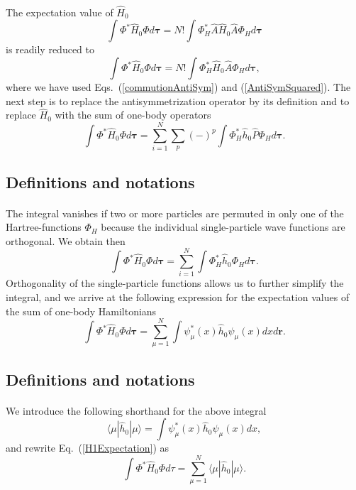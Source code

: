 \documentclass[%
twoside,                 %
final,                   %
10pt]{article}
\begin{document}
\paragraph{}
The expectation value of $\hat{H}_0$ 
\[
  \int \Phi^*\hat{H}_0\Phi d\mathbf{\tau} 
  = N! \int \Phi_H^*\hat{A}\hat{H}_0\hat{A}\Phi_H d\mathbf{\tau}
\]
is readily reduced to
\[
  \int \Phi^*\hat{H}_0\Phi d\mathbf{\tau} 
  = N! \int \Phi_H^*\hat{H}_0\hat{A}\Phi_H d\mathbf{\tau},
\]
where we have used Eqs.~(\ref{commutionAntiSym}) and
(\ref{AntiSymSquared}). The next step is to replace the antisymmetrization
operator by its definition and to
replace $\hat{H}_0$ with the sum of one-body operators
\[
  \int \Phi^*\hat{H}_0\Phi  d\mathbf{\tau}
  = \sum_{i=1}^N \sum_{p} (-)^p\int 
  \Phi_H^*\hat{h}_0\hat{P}\Phi_H d\mathbf{\tau}.
\]



\subsection{Definitions and notations}

\paragraph{}
The integral vanishes if two or more particles are permuted in only one
of the Hartree-functions $\Phi_H$ because the individual single-particle wave functions are
orthogonal. We obtain then
\[
  \int \Phi^*\hat{H}_0\Phi  d\mathbf{\tau}= \sum_{i=1}^N \int \Phi_H^*\hat{h}_0\Phi_H  d\mathbf{\tau}.
\]
Orthogonality of the single-particle functions allows us to further simplify the integral, and we
arrive at the following expression for the expectation values of the
sum of one-body Hamiltonians 
\begin{equation}
  \int \Phi^*\hat{H}_0\Phi  d\mathbf{\tau}
  = \sum_{\mu=1}^N \int \psi_{\mu}^*(x)\hat{h}_0\psi_{\mu}(x)dx
  d\mathbf{r}.
  \label{H1Expectation}
\end{equation}



\subsection{Definitions and notations}

\paragraph{}
We introduce the following shorthand for the above integral
\[
\langle \mu | \hat{h}_0 | \mu \rangle = \int \psi_{\mu}^*(x)\hat{h}_0\psi_{\mu}(x)dx,
\]
and rewrite Eq.~(\ref{H1Expectation}) as
\begin{equation}
  \int \Phi^*\hat{H}_0\Phi  d\tau
  = \sum_{\mu=1}^N \langle \mu | \hat{h}_0 | \mu \rangle.
  \label{H1Expectation1}
\end{equation}
\end{document}
